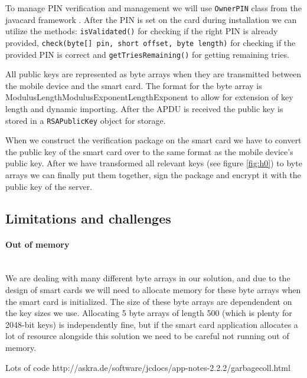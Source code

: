 To manage PIN verification and management we will use \texttt{OwnerPIN} class from the javacard framework \cite{ownerpin}. After the PIN is set on the card during installation we can utilize the methods: \texttt{isValidated()} for checking if the right PIN is already provided, \texttt{check(byte[] pin, short offset, byte length)} for checking if the provided PIN is correct and \texttt{getTriesRemaining()} for getting remaining tries.

All public keys are represented as byte arrays when they are transmitted between the mobile device and the smart card. The format for the byte array is \textbar{}ModulusLength\textbar{}Modulus\textbar{}ExponentLength\textbar{}Exponent\textbar{} to allow for extension of key length and dynamic importing. After the APDU is received the public key is stored in a \texttt{RSAPublicKey} object for storage.

When we construct the verification package on the smart card we have to convert the public key of the smart card over to the same format as the mobile device's public key. After we have transformed all relevant keys (see figure \ref{fig:h0}) to byte arrays we can finally put them together, sign the package and encrypt it with the public key of the server.

\subsection{Limitations and challenges}
\paragraph{Out of memory}\mbox{}\\
We are dealing with many different byte arrays in our solution, and due to the design of smart cards we will need to allocate memory for these byte arrays when the smart card is initialized. The size of these byte arrays are dependendent on the key sizes we use. Allocating 5 byte arrays of length 500 (which is plenty for 2048-bit keys) is independently fine, but if the smart card application allocates a lot of resource alongside this solution we need to be careful not running out of memory.

Lots of code http://askra.de/software/jcdocs/app-notes-2.2.2/garbagecoll.html \\

